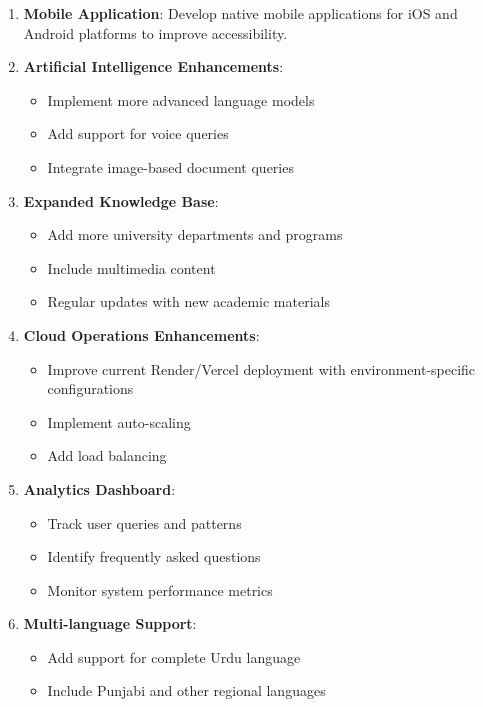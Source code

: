 \documentclass[12pt,a4paper]{book}
\numberwithin{table}{chapter}
\numberwithin{figure}{chapter}
\numberwithin{equation}{chapter}
\begin{document}
\begin{enumerate}
    \item \textbf{Mobile Application}: Develop native mobile applications for iOS and Android platforms to improve accessibility.

    \item \textbf{Artificial Intelligence Enhancements}:
    \begin{itemize}
        \item Implement more advanced language models
        \item Add support for voice queries
        \item Integrate image-based document queries
    \end{itemize}

    \item \textbf{Expanded Knowledge Base}:
    \begin{itemize}
        \item Add more university departments and programs
        \item Include multimedia content
        \item Regular updates with new academic materials
    \end{itemize}

    \item \textbf{Cloud Operations Enhancements}:
    \begin{itemize}
        \item Improve current Render/Vercel deployment with environment-specific configurations
        \item Implement auto-scaling
        \item Add load balancing
    \end{itemize}

    \item \textbf{Analytics Dashboard}:
    \begin{itemize}
        \item Track user queries and patterns
        \item Identify frequently asked questions
        \item Monitor system performance metrics
    \end{itemize}

    \item \textbf{Multi-language Support}:
    \begin{itemize}
        \item Add support for complete Urdu language
        \item Include Punjabi and other regional languages
    \end{itemize}


\end{enumerate}
\end{document}
